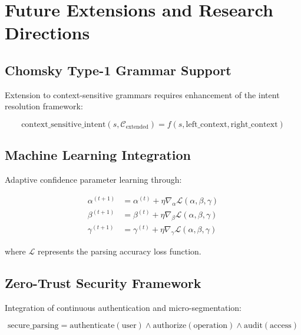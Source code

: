\documentclass[11pt,a4paper]{article}
\theoremstyle{definition}
\theoremstyle{remark}
\begin{document}

\section{Future Extensions and Research Directions}
\label{sec:future-extensions}

\subsection{Chomsky Type-1 Grammar Support}
\label{subsec:chomsky-type1}

Extension to context-sensitive grammars requires enhancement of the intent resolution framework:

\begin{equation}
\text{context\_sensitive\_intent}(s, \mathcal{C}_{\text{extended}}) = f(s, \text{left\_context}, \text{right\_context})
\end{equation}

\subsection{Machine Learning Integration}
\label{subsec:ml-integration}

Adaptive confidence parameter learning through:

\begin{align}
\alpha^{(t+1)} &= \alpha^{(t)} + \eta \nabla_\alpha \mathcal{L}(\alpha, \beta, \gamma) \\
\beta^{(t+1)} &= \beta^{(t)} + \eta \nabla_\beta \mathcal{L}(\alpha, \beta, \gamma) \\
\gamma^{(t+1)} &= \gamma^{(t)} + \eta \nabla_\gamma \mathcal{L}(\alpha, \beta, \gamma)
\end{align}

where $\mathcal{L}$ represents the parsing accuracy loss function.

\subsection{Zero-Trust Security Framework}
\label{subsec:zero-trust}

Integration of continuous authentication and micro-segmentation:

\begin{equation}
\text{secure\_parsing} = \text{authenticate}(\text{user}) \land \text{authorize}(\text{operation}) \land \text{audit}(\text{access})
\end{equation}
\end{document}

